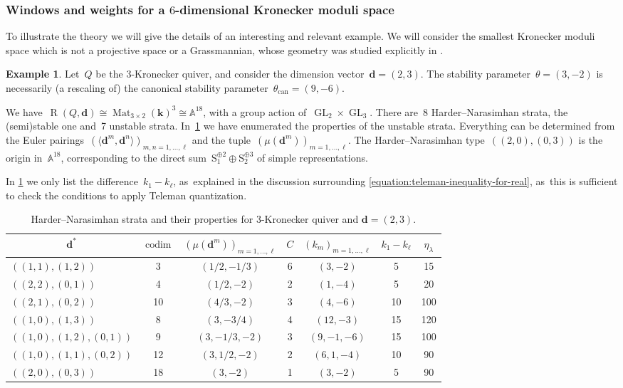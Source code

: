 \documentclass[JEP,XML,SOM,Unicode,NoEqCountersInSection,published]{cedram}
\theoremstyle{plain}
\theoremstyle{definition}
\newtheorem{example}[theorem]{Example}
\DeclareMathOperator\GL{GL}
\DeclareMathOperator\Mat{Mat}
\DeclareMathOperator\Rep{R}
\newcommand\can{\ensuremath{\mathrm{can}}}
\newcommand\field{\mathbf{k}}
\newcommand\tuple[1]{\ensuremath{{\boldsymbol{#1}}}}
\begin{document}
\subsubsection*{Windows and weights for a $6$-dimensional Kronecker moduli space}
To illustrate the theory we will give the details of an interesting and relevant example.
We will consider the smallest Kronecker moduli space which is not a projective space or a Grassmannian,
whose geometry was studied explicitly in \cite{MR4770368}.
\begin{example}
\label{example:kronecker-moduli-space}
Let~$Q$ be the $3$-Kronecker quiver,
and consider the dimension vector~$\tuple{d}=(2,3)$.
The stability parameter~$\theta=(3,-2)$ is necessarily
(a rescaling of) the canonical stability parameter~$\theta_\can=(9,-6)$.
\end{example}
We have~$\Rep(Q,\tuple{d})\cong\Mat_{3\times 2}(\field)^3\cong\mathbb{A}^{18}$,
with a group action of~$\GL_2\times\GL_3$.
There are~8 Harder--Nara\-sim\-han strata,
the (semi)stable one and~7 unstable strata. In~\cref{table:harder-narasimhan-strata} we have enumerated the properties of the unstable strata.
Everything can be determined from the Euler pairings~$(\langle\tuple{d}^m,\tuple{d}^n\rangle)_{m,n=1,\ldots,\ell}$
and the tuple~$(\mu(\tuple{d}^m))_{m=1,\ldots,\ell}$.
The Harder--Narasimhan type~$((2,0),(0,3))$ is the origin in~$\mathbb{A}^{18}$,
corresponding to the direct sum~$\mathrm{S}_1^{\oplus2}\oplus\mathrm{S}_2^{\oplus3}$ of simple representations.

In \cref{table:harder-narasimhan-strata} we only list the difference~$k_1-k_\ell$, as~explained in the discussion surrounding \eqref{equation:teleman-inequality-for-real}, as~this is sufficient to check the conditions to apply Teleman quantization.

\begin{table}
\centering
\caption{Harder--Narasimhan strata and their properties for 3\protect\nobreakdash-Kro\-necker quiver and $\tuple{d}=(2,3)$.}
\label{table:harder-narasimhan-strata}
\begin{tabular}{lcccccc}
\toprule
\multicolumn{1}{c}{$\tuple{d}^*$} & $\operatorname{codim}$ & $(\mu(\tuple{d}^m))_{m=1,\ldots,\ell}$ & $C$ & $(k_m)_{m=1,\ldots,\ell}$ & $k_1-k_\ell$ & $\eta_\lambda$ \\
\midrule
$((1,1),(1,2))$ & 3 & $(1/2,-1/3)$ & 6 & $(3,-2)$ & 5 & 15 \\
$((2,2),(0,1))$ & 4 & $(1/2,-2)$ & 2 & $(1,-4)$ & 5 & 20 \\
$((2,1),(0,2))$ & 10 & $(4/3,-2)$ & 3 & $(4,-6)$ & 10 & 100 \\
$((1,0),(1,3))$ & 8 & $(3,-3/4)$ & 4 & $(12,-3)$ & 15 & 120 \\
$((1,0),(1,2),(0,1))$ & 9 & $(3,-1/3,-2)$ & 3 & $(9,-1,-6)$ & 15 & 100 \\
$((1,0),(1,1),(0,2))$ & 12 & $(3,1/2,-2)$ & 2 & $(6,1,-4)$ & 10 & 90 \\
$((2,0),(0,3))$ & 18 & $(3,-2)$ & 1 & $(3,-2)$ & 5 & 90 \\
\bottomrule
\end{tabular}
\end{table}
\end{document}
